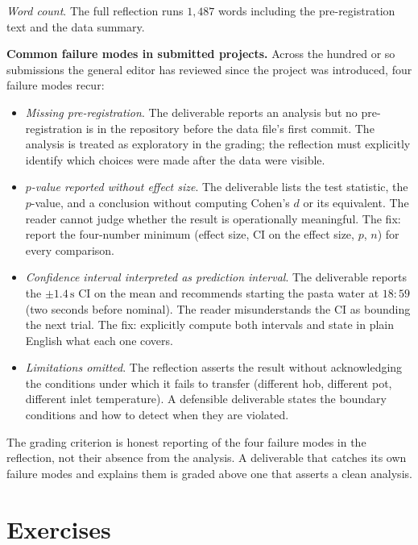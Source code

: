 \begin{project}
\smallskip
\textit{Word count}. The full reflection runs $1{,}487$ words
including the pre-registration text and the data summary.

\textbf{Common failure modes in submitted projects.} Across the
hundred or so submissions the general editor has reviewed since
the project was introduced, four failure modes recur:

\begin{itemize}[leftmargin=*]
  \item \textit{Missing pre-registration}. The deliverable
    reports an analysis but no pre-registration is in the
    repository before the data file's first commit. The
    analysis is treated as exploratory in the grading; the
    reflection must explicitly identify which choices were
    made after the data were visible.
  \item \textit{$p$-value reported without effect size}. The
    deliverable lists the test statistic, the $p$-value, and
    a conclusion without computing Cohen's $d$ or its
    equivalent. The reader cannot judge whether the result is
    operationally meaningful. The fix: report the four-number
    minimum (effect size, CI on the effect size, $p$, $n$) for
    every comparison.
  \item \textit{Confidence interval interpreted as prediction
    interval}. The deliverable reports the $\pm 1.4\,
    \si{\second}$ CI on the mean and recommends starting the
    pasta water at $18{:}59$ (two seconds before nominal). The
    reader misunderstands the CI as bounding the next trial.
    The fix: explicitly compute both intervals and state in
    plain English what each one covers.
  \item \textit{Limitations omitted}. The reflection asserts the
    result without acknowledging the conditions under which it
    fails to transfer (different hob, different pot, different
    inlet temperature). A defensible deliverable states the
    boundary conditions and how to detect when they are
    violated.
\end{itemize}

The grading criterion is honest reporting of the four failure
modes in the reflection, not their absence from the analysis.
A deliverable that catches its own failure modes and explains
them is graded above one that asserts a clean analysis.
\end{project}

\section{Exercises}

